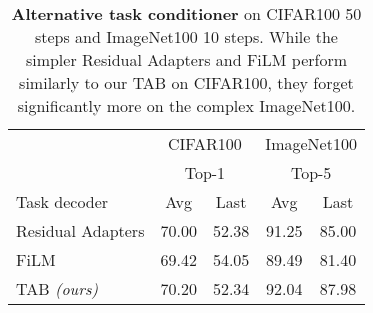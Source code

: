 \begin{table}[t]
    \centering
    \begin{tabular}{@{}l|cc|cc@{}}
        \hline
                                                             & \multicolumn{2}{c}{CIFAR100} & \multicolumn{2}{c}{ImageNet100}
        \\
                                                             & \multicolumn{2}{c}{Top-1}    & \multicolumn{2}{c}{Top-5}
        \\
        Task decoder                                         & Avg                          & Last                            & Avg   & Last  \\
        \hline
        Residual Adapters \cite{rebuffi2017residualadapters} & 70.00                        & 52.38                           & 91.25 & 85.00 \\
        FiLM \cite{perez2018film}                            & 69.42                        & 54.05                           & 89.49 & 81.40 \\
        TAB \textit{(ours)}                                  & 70.20                        & 52.34                           & 92.04 & 87.98 \\
        \hline
    \end{tabular}
    \caption{\textbf{Alternative task conditioner} on CIFAR100 50 steps and ImageNet100 10 steps.
        While the simpler Residual Adapters and FiLM perform similarly to our TAB on CIFAR100, they
        forget significantly more on the complex ImageNet100.}
    \label{tab:dytox_task_cond}
\end{table}
